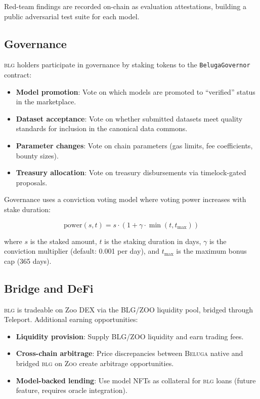 \documentclass[11pt,letterpaper]{article}
\newcommand{\Zoo}{\textsc{Zoo}}
\newcommand{\Beluga}{\textsc{Beluga}}
\newcommand{\BLG}{\textsc{blg}}
\begin{document}
Red-team findings are recorded on-chain as evaluation attestations, building a public adversarial test suite for each model.

\subsection{Governance}

\BLG{} holders participate in governance by staking tokens to the \texttt{BelugaGovernor} contract:

\begin{itemize}[nosep]
    \item \textbf{Model promotion}: Vote on which models are promoted to ``verified'' status in the marketplace.
    \item \textbf{Dataset acceptance}: Vote on whether submitted datasets meet quality standards for inclusion in the canonical data commons.
    \item \textbf{Parameter changes}: Vote on chain parameters (gas limits, fee coefficients, bounty sizes).
    \item \textbf{Treasury allocation}: Vote on treasury disbursements via timelock-gated proposals.
\end{itemize}

Governance uses a conviction voting model where voting power increases with stake duration:

\begin{equation}
\text{power}(s, t) = s \cdot (1 + \gamma \cdot \min(t, t_{\max}))
\end{equation}

where $s$ is the staked amount, $t$ is the staking duration in days, $\gamma$ is the conviction multiplier (default: 0.001 per day), and $t_{\max}$ is the maximum bonus cap (365 days).

\subsection{Bridge and DeFi}

\BLG{} is tradeable on Zoo DEX via the BLG/ZOO liquidity pool, bridged through Teleport. Additional earning opportunities:

\begin{itemize}[nosep]
    \item \textbf{Liquidity provision}: Supply BLG/ZOO liquidity and earn trading fees.
    \item \textbf{Cross-chain arbitrage}: Price discrepancies between \Beluga{} native and bridged \BLG{} on \Zoo{} create arbitrage opportunities.
    \item \textbf{Model-backed lending}: Use model NFTs as collateral for \BLG{} loans (future feature, requires oracle integration).
\end{itemize}
\end{document}
